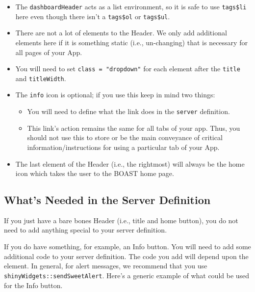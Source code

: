 \documentclass[
]{book}
\providecommand{\tightlist}{%
  \setlength{\itemsep}{0pt}\setlength{\parskip}{0pt}}
\begin{document}
\begin{itemize}
\tightlist
\item
  The \texttt{dashboardHeader} acts as a list environment, so it is safe to use \texttt{tags\$li} here even though there isn't a \texttt{tags\$ol} or \texttt{tags\$ul}.
\item
  There are not a lot of elements to the Header. We only add additional elements here if it is something static (i.e., un-changing) that is necessary for all pages of your App.
\item
  You will need to set \texttt{class\ =\ "dropdown"} for each element after the \texttt{title} and \texttt{titleWidth}.
\item
  The \texttt{info} icon is optional; if you use this keep in mind two things:

  \begin{itemize}
  \tightlist
  \item
    You will need to define what the link does in the \texttt{server} definition.
  \item
    This link's action remains the same for all tabs of your app. Thus, you should not use this to store or be the main conveyance of critical information/instructions for using a particular tab of your App.
  \end{itemize}
\item
  The last element of the Header (i.e., the rightmost) will always be the home icon which takes the user to the BOAST home page.
\end{itemize}

\hypertarget{whats-needed-in-the-server-definition}{%
\subsection{What's Needed in the Server Definition}\label{whats-needed-in-the-server-definition}}

If you just have a bare bones Header (i.e., title and home button), you do not need to add anything special to your server definition.

If you do have something, for example, an Info button. You will need to add some additional code to your server definition. The code you add will depend upon the element. In general, for alert messages, we recommend that you use \texttt{shinyWidgets::sendSweetAlert}. Here's a generic example of what could be used for the Info button.
\end{document}
